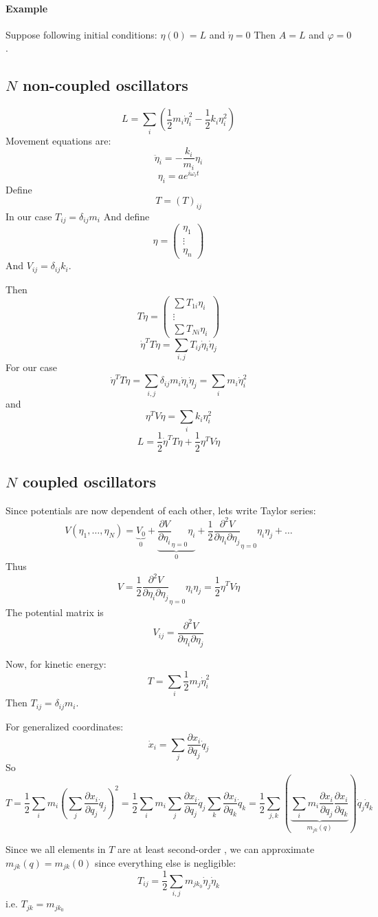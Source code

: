 \paragraph{Example}
Suppose following initial conditions: $\eta(0) = L$ and $\dot{\eta} = 0$
Then $A=L$ and $\varphi = 0$.
\subsection{$N$ non-coupled oscillators}
$$L  = \sum_i \left( \frac{1}{2}m_i\dot{\eta}_i^2  - \frac{1}{2} k_i  \eta_i^2\right)$$
Movement equations are:
$$\ddot{\eta}_i = -\frac{k_i}{m_i} \eta_i$$
$$\eta_i = a e^{i\omega_i t}$$
Define 
$$T = (T)_{ij}$$
In our case
$T_{ij} = \delta_{ij} m_i$
And define $$\eta = \begin{pmatrix}\eta_1 \\ \vdots \\ \eta_n\end{pmatrix}$$
And $V_{ij} = \delta_{ij} k_i$.

Then
$$T\dot{\eta} = \begin{pmatrix} \sum T_{1i}\eta_i \\ \vdots \\ \sum T_{Ni}\eta_i \end{pmatrix}$$ 
$$\dot{\eta}^T T\dot{\eta} = \sum_{i,j} T_{ij} \dot{\eta}_i \dot{\eta}_j$$
For our case $$\dot{\eta}^T T\dot{\eta} = \sum_{i,j} \delta_{ij} m_i \dot{\eta}_i \dot{\eta}_j = \sum_i m_i \dot{\eta}_i^2$$
and
$$\eta^T V \eta = \sum_i k_i \eta^2_i$$
$$L = \frac{1}{2} \dot{\eta}^T T\dot{\eta} + \frac{1}{2} \eta^T V \eta $$


\subsection{$N$ coupled oscillators}
Since potentials are now dependent of each other, lets write Taylor series:
$$V(\eta_1, \dots, \eta_N) = \underbrace{V_0}_{0} + \underbrace{\frac{\partial V}{\partial \eta_i}_{\eta=0} \eta_i}_{0} + \frac{1}{2}\frac{\partial^2 V}{\partial \eta_i \partial \eta_j}_{\eta=0} \eta_i \eta_j + \dots$$
Thus
$$V = \frac{1}{2} \frac{\partial^2 V}{\partial \eta_i \partial \eta_j}_{\eta=0} \eta_i \eta_j = \frac{1}{2} \eta^T V \eta$$
The potential matrix is
$$V_{ij} = \frac{\partial^2 V}{\partial \eta_i \partial \eta_j}$$

Now, for kinetic energy:
$$T = \sum_{i} \frac{1}{2} m_j \dot{\eta}^2_i$$
Then $T_{ij} = \delta_{ij} m_i$.

For generalized coordinates:
$$\dot{x}_i = \sum_j \frac{\partial x_i}{\partial q_j} \dot{q}_j$$
So
$$T = \frac{1}{2} \sum_i m_i \left( \sum_j \frac{\partial x_i}{\partial q_j} \dot{q}_j \right)^2 = \frac{1}{2} \sum_i m_i \sum_j \frac{\partial x_i}{\partial q_j} \dot{q}_j \sum_k \frac{\partial x_i}{\partial q_k} \dot{q}_k = \frac{1}{2} \sum_{j,k} \left( \underbrace{\sum_i m_i   \frac{\partial x_i}{\partial q_j} \frac{\partial x_i}{\partial q_k}}_{m_{jk}(q)}\right) \dot{q}_j \dot{q}_k $$

Since we all elements in $T$ are at least second-order , we can approximate $m_{jk}(q) = m_{jk}(0)$ since everything else is negligible:
$$T_{ij} = \frac{1}{2} \sum_{i,j} m_{jk_0} \dot{\eta}_j \dot{\eta}_k$$
i.e. $T_{jk} = m_{jk_0}$
